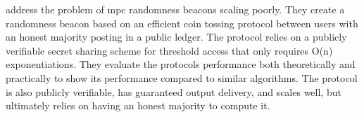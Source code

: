\item [SCRAPE: Scalable Randomness Attested by Public Entities]
\citet*{cascudo2017scrape} address the problem of \gls{mpc} randomness beacons scaling poorly. They create a randomness beacon based on an efficient coin tossing protocol between users with an honest majority posting in a public ledger. The protocol relies on a publicly verifiable secret sharing scheme for threshold access that only requires O(n) exponentiations. They evaluate the protocols performance both theoretically and practically to show its performance compared to similar algorithms. The protocol is also publicly verifiable, has guaranteed output delivery, and scales well, but ultimately relies on having an honest majority to compute it. 